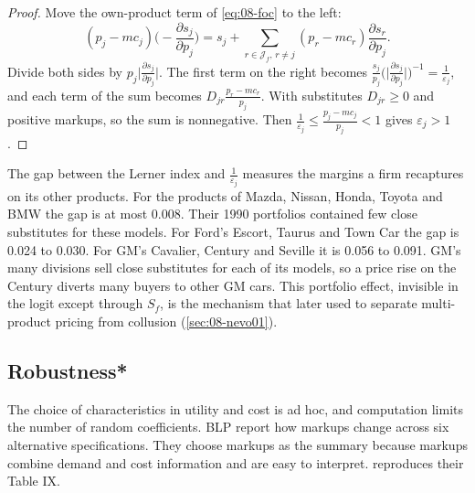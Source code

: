 \begin{proof}
Move the own-product term of \eqref{eq:08-foc} to the left:
\begin{equation*}
(p_j-mc_j)\Big(-\frac{\partial s_j}{\partial p_j}\Big)=s_j
 +\sum_{r\in\mathcal{J}_f,\,r\neq j}(p_r-mc_r)\frac{\partial s_r}{\partial p_j}.
\end{equation*}
Divide both sides by $p_j\big|\frac{\partial s_j}{\partial p_j}\big|$. The first term on the right
becomes $\frac{s_j}{p_j}\Big(\Big|\frac{\partial s_j}{\partial p_j}\Big|\Big)^{-1}=\frac{1}{\varepsilon_j}$,
and each term of the
sum becomes $D_{jr}\frac{p_r-mc_r}{p_j}$. With substitutes $D_{jr}\geq0$ and positive markups, so the
sum is nonnegative. Then $\frac{1}{\varepsilon_j}\leq\frac{p_j-mc_j}{p_j}<1$ gives
$\varepsilon_j>1$.
\end{proof}

The gap between the Lerner index and $\frac{1}{\varepsilon_j}$ measures the margins a firm recaptures
on its other products. For the products of Mazda, Nissan, Honda, Toyota and BMW the gap is at most
0.008. Their 1990 portfolios contained few close substitutes for these models. For Ford's Escort, Taurus
and Town Car the gap is 0.024 to 0.030. For GM's Cavalier, Century and Seville it is 0.056 to 0.091.
GM's many divisions sell close substitutes for each of its models, so a price rise on the Century
diverts many buyers to other GM cars. This portfolio effect, invisible in the logit except through
$S_f$, is the mechanism that \citet{Nevo2001} later used to separate multi-product pricing from collusion
(\cref{sec:08-nevo01}).

\subsection{Robustness*}\label{sec:08-blp95-robust}

The choice of characteristics in utility and cost is ad hoc, and computation limits the number of
random coefficients. BLP report how markups change across six alternative specifications. They choose
markups as the summary because markups combine demand and cost information and are easy to interpret.
 reproduces their Table IX.

